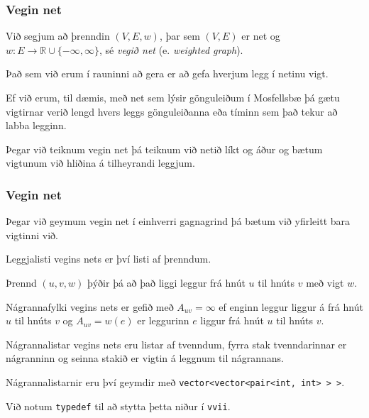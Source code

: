 {
}

{
	\frametitle{Vegin net}
	{
		\item<1-> Við segjum að þrenndin $(V, E, w)$, þar sem $(V, E)$ er net og $w \colon E \rightarrow \mathbb{R} \cup \{-\infty, \infty\}$, sé
					\emph{vegið net} (e. \emph{weighted graph}).
		\item<2-> Það sem við erum í rauninni að gera er að gefa hverjum legg í netinu vigt.
		\item<3-> Ef við erum, til dæmis, með net sem lýsir gönguleiðum í Mosfellsbæ þá gætu vigtirnar verið lengd hvers leggs gönguleiðanna
					eða tíminn sem það tekur að labba legginn.
		\item<4-> Þegar við teiknum vegin net þá teiknum við netið líkt og áður og bætum vigtunum við hliðina á tilheyrandi leggjum.
	}
}

{
	\frametitle{Vegin net}
	{
		\item<1-> Þegar við geymum vegin net í einhverri gagnagrind þá bætum við yfirleitt bara vigtinni við.
		\item<2-> Leggjalisti vegins nets er því listi af þrenndum.
		\item<3-> Þrennd $(u, v, w)$ þýðir þá að það liggi leggur frá hnút $u$ til hnúts $v$ með vigt $w$.
		\item<4-> Nágrannafylki vegins nets er gefið með $A_{uv} = \infty$ ef enginn leggur liggur á frá hnút $u$ til hnúts $v$ og
					$A_{uv} = w(e)$ er leggurinn $e$ liggur frá hnút $u$ til hnúts $v$.
		\item<5-> Nágrannalistar vegins nets eru listar af tvenndum, fyrra stak tvenndarinnar er nágranninn og seinna stakið er vigtin á leggnum
					til nágrannans.
		\item<6-> Nágrannalistarnir eru því geymdir með \texttt{vector<vector<pair<int, int>\!\!\!\! >\!\!\!\! >}.
		\item<7-> Við notum \texttt{typedef} til að stytta þetta niður í \texttt{vvii}.
	}
}

{
}

{
}


